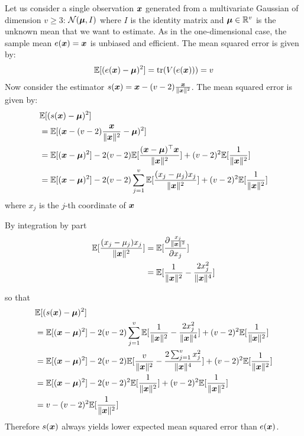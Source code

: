 \begin{example}
  \label{ex:stein}
  Let us consider a single observation $\xb$ generated from a multivariate Gaussian
  of dimension $v \geq 3$: $\Ncal(\mub, I)$ where $I$ is the identity matrix and
  $\mub \in \RR^v$ is the unknown mean that we want to estimate.
  As in the one-dimensional case, the sample mean $e(\xb) =\xb$ is unbiased and efficient.
  The mean squared error is given by:
  \begin{align}
    \EE[(e(\xb) -  \mub )^2] = \tr(V(e(\xb))) = v
  \end{align}
  Now consider the estimator $s(\xb) = \xb - (v-2) \frac{\xb}{\|\xb\|^2}$.
  The mean squared error is given by:
  \begin{align}
    &\EE[(s(\xb) - \mub)^2] \\ &= \EE[(\xb - (v-2) \frac{\xb}{\|\xb\|^2} - \mub)^2] \\
                        &= \EE[(\xb - \mub)^2] -2 (v-2)\EE[\frac{(\xb - \mub)^{\top}\xb}{\|\xb\|^2}] + (v-2)^2 \EE[\frac1{\| \xb \|^2}] \\
                            &= \EE[(\xb - \mub)^2] -2 (v-2) \sum_{j=1}^v \EE[\frac{(x_j - \mu_j)x_j}{\|\xb\|^2}] + (v-2)^2 \EE[\frac1{\| \xb \|^2}]
  \end{align}
  where $x_j$ is the $j$-th coordinate of $\xb$

  By integration by part 
  \begin{align}
    \EE[\frac{(x_j - \mu_j)x_j}{\|\xb\|^2}] &= \EE[\partialfrac{x_j}{\frac{x_j}{\|\xb\|^2}}]  \\
    &= \EE[\frac1{\|\xb\|^2} - \frac{2x_j^2}{\|\xb\|^4}]
  \end{align}

  so that 
  \begin{align}
    &\EE[(s(\xb) - \mub)^2] \\
    &= \EE[(\xb - \mub)^2] -2 (v-2) \sum_{j=1}^v \EE[\frac1{\|\xb\|^2} - \frac{2x_j^2}{\|\xb\|^4}] + (v-2)^2 \EE[\frac1{\| \xb \|^2}] \\
    &= \EE[(\xb - \mub)^2] -2 (v-2) \EE[\frac{v}{\|\xb\|^2} - \frac{2 \sum_{j=1}^v x_j^2}{\|\xb\|^4}] + (v-2)^2 \EE[\frac1{\| \xb \|^2}] \\
    &= \EE[(\xb - \mub)^2] -2 (v-2)^2 \EE[\frac1{\|\xb\|^2}] + (v-2)^2 \EE[\frac1{\| \xb \|^2}] \\
    &= v - (v-2)^2 \EE[\frac1{\|\xb\|^2}]
 \end{align}
 Therefore $s(\xb)$ always yields lower expected mean squared error than
 $e(\xb)$.
\end{example}

